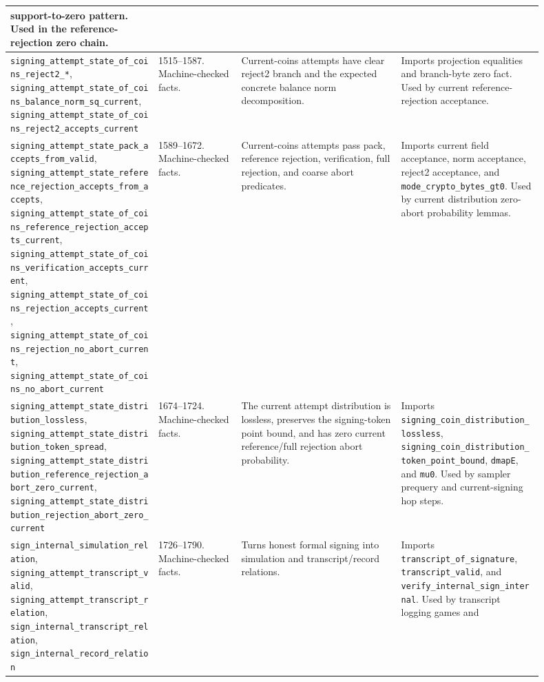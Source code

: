 \documentclass[11pt]{report}
\DeclareRobustCommand{\ec}[1]{\ifmmode\text{\nolinkurl{#1}}\else\nolinkurl{#1}\fi}
\theoremstyle{definition}
\theoremstyle{plain}
\begin{document}
{\begin{longtable}{p{0.25\linewidth}p{0.14\linewidth}p{0.27\linewidth}p{0.24\linewidth}}
support-to-zero pattern.  Used in the reference-rejection zero chain. \\
\midrule
\ec{signing\_attempt\_state\_of\_coins\_reject2\_*},
\ec{signing\_attempt\_state\_of\_coins\_balance\_norm\_sq\_current},
\ec{signing\_attempt\_state\_of\_coins\_reject2\_accepts\_current} &
1515--1587. Machine-checked facts. &
Current-coins attempts have clear reject2 branch and the expected concrete
balance norm decomposition. &
Imports projection equalities and branch-byte zero fact.  Used by current
reference-rejection acceptance. \\
\midrule
\ec{signing\_attempt\_state\_pack\_accepts\_from\_valid},
\ec{signing\_attempt\_state\_reference\_rejection\_accepts\_from\_accepts},
\ec{signing\_attempt\_state\_of\_coins\_reference\_rejection\_accepts\_current},
\ec{signing\_attempt\_state\_of\_coins\_verification\_accepts\_current},
\ec{signing\_attempt\_state\_of\_coins\_rejection\_accepts\_current},
\ec{signing\_attempt\_state\_of\_coins\_rejection\_no\_abort\_current},
\ec{signing\_attempt\_state\_of\_coins\_no\_abort\_current} &
1589--1672. Machine-checked facts. &
Current-coins attempts pass pack, reference rejection, verification, full
rejection, and coarse abort predicates. &
Imports current field acceptance, norm acceptance, reject2 acceptance, and
\ec{mode\_crypto\_bytes\_gt0}.  Used by current distribution zero-abort
probability lemmas. \\
\midrule
\ec{signing\_attempt\_state\_distribution\_lossless},
\ec{signing\_attempt\_state\_distribution\_token\_spread},
\ec{signing\_attempt\_state\_distribution\_reference\_rejection\_abort\_zero\_current},
\ec{signing\_attempt\_state\_distribution\_rejection\_abort\_zero\_current} &
1674--1724. Machine-checked facts. &
The current attempt distribution is lossless, preserves the signing-token
point bound, and has zero current reference/full rejection abort probability. &
Imports \ec{signing\_coin\_distribution\_lossless},
\ec{signing\_coin\_distribution\_token\_point\_bound}, \ec{dmapE}, and
\ec{mu0}.  Used by sampler prequery and current-signing hop steps. \\
\midrule
\ec{sign\_internal\_simulation\_relation},
\ec{signing\_attempt\_transcript\_valid},
\ec{signing\_attempt\_transcript\_relation},
\ec{sign\_internal\_transcript\_relation},
\ec{sign\_internal\_record\_relation} &
1726--1790. Machine-checked facts. &
Turns honest formal signing into simulation and transcript/record relations. &
Imports \ec{transcript\_of\_signature}, \ec{transcript\_valid}, and
\ec{verify\_internal\_sign\_internal}.  Used by transcript logging games and

\end{longtable}}
\end{document}
